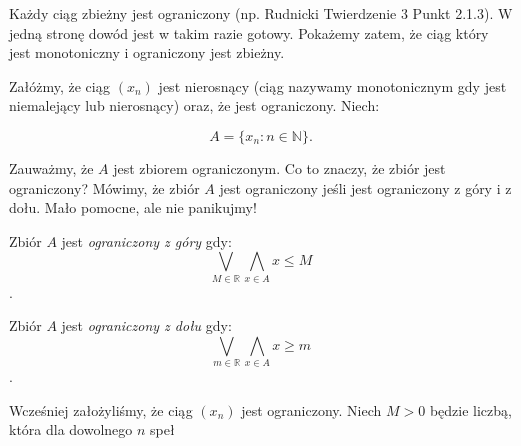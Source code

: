 \documentclass[a4paper,oneside,openright,11pt]{article}
\numberwithin{equation}{section}
\begin{document}
Każdy ciąg zbieżny jest ograniczony (np. Rudnicki Twierdzenie 3 Punkt 2.1.3). W jedną stronę dowód jest w takim razie gotowy.
Pokażemy zatem, że ciąg który jest monotoniczny i ograniczony jest zbieżny.
\vspace{10mm}


\noindent
Załóżmy, że ciąg $(x_n)$ jest nierosnący (ciąg nazywamy monotonicznym gdy jest niemalejący lub nierosnący) oraz, że jest ograniczony.
Niech: 

\begin{equation*}
    A = \{ x_n : n \in \mathbb{N} \}.
\end{equation*}


\noindent
Zauważmy, że $A$ jest zbiorem ograniczonym. Co to znaczy, że zbiór jest ograniczony? Mówimy, że zbiór $A$ jest ograniczony jeśli
jest ograniczony z góry i z dołu. Mało pomocne, ale nie panikujmy!
\vspace{10mm}

Zbiór $A$ jest \emph{ograniczony z góry} gdy: $$\bigvee_{M \in \mathbb{R}}  \bigwedge_{x \in A} x \leq M$$.

Zbiór $A$ jest \emph{ograniczony z dołu} gdy: $$\bigvee_{m \in \mathbb{R}}  \bigwedge_{x \in A} x \geq m$$.


Wcześniej założyliśmy, że ciąg $(x_n)$ jest ograniczony. Niech $M > 0$ będzie liczbą, która dla dowolnego $n$ speł
\end{document}
